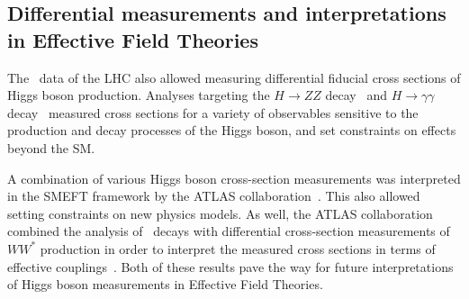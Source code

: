\subsection{Differential measurements and interpretations in Effective Field Theories}
The \RunTwo\ data of the LHC also allowed measuring differential fiducial cross sections of Higgs boson production. Analyses targeting the $H \to ZZ$ decay~\cite{ATLAS:2020wny} and $H \to \gamma\gamma$ decay~\cite{hgammagammaDiff} measured cross sections for a variety of observables sensitive to the production and decay processes of the Higgs boson, and set constraints on effects beyond the SM.

A combination of various Higgs boson cross-section measurements was interpreted in the SMEFT framework by the ATLAS collaboration~\cite{ATLAS-CONF-2020-053}. This also allowed setting constraints on new physics models.
As well, the ATLAS collaboration combined the analysis of \HWW\ decays with differential cross-section measurements of $WW^*$ production in order to interpret the measured cross sections in terms of effective couplings~\cite{ATL-PHYS-PUB-2021-010}.
Both of these results pave the way for future interpretations of Higgs boson measurements in Effective Field Theories. %




